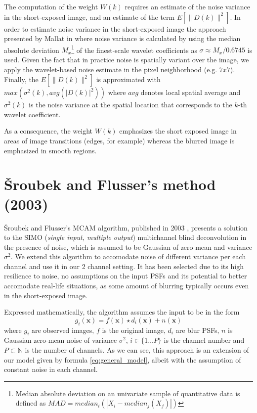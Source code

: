 \documentclass[12pt,notitlepage]{report}
\begin{document}
The computation of the weight $W(k)$ requires an estimate of the noise variance in the short-exposed image, and an estimate of the term $E[\|D(k)\|^2]$.  In order to estimate noise variance in the short-exposed image the approach presented by Mallat in \cite{mall09} where noise variance is calculated by using the median absolute deviation $M_x$\footnote[5]{Median absolute deviation on an univariate sample of quantitative data is defined as $MAD = median_i( | X_i - median_j(X_j)|) $} of the finest-scale wavelet coefficients  as $\sigma \approx M_x/0.6745$ is used. Given the fact that in practice noise is spatially variant over the image, we apply the wavelet-based noise estimate in the pixel neighborhood (e.g. $7x7$). Finally, the $E[\|D(k)\|^2]$ is approximated with $max(\sigma^2(k),avg(|D(k)|^2))$ where $avg$ denotes local spatial average and $\sigma^2(k)$ is the noise variance at the spatial location that corresponds to the $k$-th wavelet coefficient.

As a consequence, the weight $W(k)$ emphasizes the short exposed image in areas of image transitions (edges, for example) whereas the blurred image is emphasized in smooth regions. 

\section{Šroubek and Flusser's method (2003)}
\label{sec:srou03}

Šroubek and Flusser's MCAM algorithm, published in 2003 \cite{srou03}, presents a solution to the SIMO ({\em single input, multiple output}) multichannel blind deconvolution in the presence of noise, which is assumed to be Gaussian of zero mean and variance $\sigma^2$. We extend this algorithm to accomodate noise of different variance per each channel and use it in our 2 channel setting. It has been selected due to its high resilience to noise, no assumptions on the input PSFs and its potential to better accomodate real-life situations, as some amount of blurring typically occurs even in the short-exposed image. 

Expressed mathematically, the algorithm assumes the input to be in the form
\begin{equation}
\label{eq:srou03_general_model}
	g_i(\mathbf{x}) = f(\mathbf{x}) \star d_i(\mathbf{x}) + n(\mathbf{x}) 	
\end{equation}
where $g_i$ are observed images, $f$ is the original image, $d_i$ are blur PSFs, $n$ is Gaussian zero-mean noise of variance $\sigma^2$, $i \in \{1 \dots P\}$ is the channel number and $P \subset \mathbb{N}$ is the number of channels. As we can see, this approach is an extension of our model given by formula \ref{eq:general_model}, albeit with the assumption of constant noise in each channel. 
\end{document}
